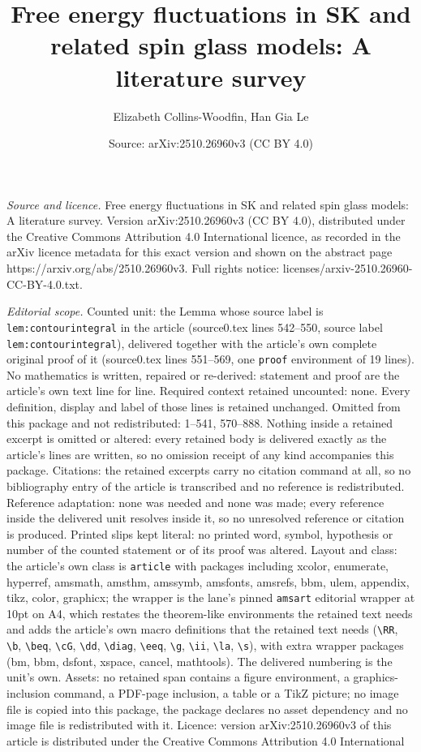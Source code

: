 \documentclass[10pt,a4paper]{amsart}
\title[Free energy fluctuations in SK and related spin glass models]{Free energy fluctuations in SK and related spin glass models: A literature survey}
\author{Elizabeth Collins-Woodfin, Han Gia Le}
\date{Source: arXiv:2510.26960v3 (CC BY 4.0)}
\begin{document}
\maketitle

\noindent\emph{Source and licence.} Free energy fluctuations in SK and related spin glass models: A literature survey. Version arXiv:2510.26960v3 (CC BY 4.0), distributed under the Creative Commons Attribution 4.0 International licence, as recorded in the arXiv licence metadata for this exact version and shown on the abstract page https://arxiv.org/abs/2510.26960v3. Full rights notice: licenses/arxiv-2510.26960-CC-BY-4.0.txt.\par\smallskip

\noindent\textit{Editorial scope.} Counted unit: the Lemma whose source label is \texttt{lem:contourintegral} in the article (source0.tex lines 542--550, source label \texttt{lem:contourintegral}), delivered together with the article's own complete original proof of it (source0.tex lines 551--569, one \texttt{proof} environment of 19 lines). No mathematics is written, repaired or re-derived: statement and proof are the article's own text line for line. Required context retained uncounted: none. Every definition, display and label of those lines is retained unchanged. Omitted from this package and not redistributed: 1--541, 570--888. Nothing inside a retained excerpt is omitted or altered: every retained body is delivered exactly as the article's lines are written, so no omission receipt of any kind accompanies this package. Citations: the retained excerpts carry no citation command at all, so no bibliography entry of the article is transcribed and no reference is redistributed. Reference adaptation: none was needed and none was made; every reference inside the delivered unit resolves inside it, so no unresolved reference or citation is produced. Printed slips kept literal: no printed word, symbol, hypothesis or number of the counted statement or of its proof was altered. Layout and class: the article's own class is \texttt{article} with packages including xcolor, enumerate, hyperref, amsmath, amsthm, amssymb, amsfonts, amsrefs, bbm, ulem, appendix, tikz, color, graphicx; the wrapper is the lane's pinned \texttt{amsart} editorial wrapper at 10pt on A4, which restates the theorem-like environments the retained text needs and adds the article's own macro definitions that the retained text needs (\texttt{\textbackslash RR}, \texttt{\textbackslash b}, \texttt{\textbackslash beq}, \texttt{\textbackslash cG}, \texttt{\textbackslash dd}, \texttt{\textbackslash diag}, \texttt{\textbackslash eeq}, \texttt{\textbackslash g}, \texttt{\textbackslash ii}, \texttt{\textbackslash la}, \texttt{\textbackslash s}), with extra wrapper packages (bm, bbm, dsfont, xspace, cancel, mathtools). The delivered numbering is the unit's own. Assets: no retained span contains a figure environment, a graphics-inclusion command, a PDF-page inclusion, a table or a TikZ picture; no image file is copied into this package, the package declares no asset dependency and no image file is redistributed with it. Licence: version arXiv:2510.26960v3 of this article is distributed under the Creative Commons Attribution 4.0 International 
\end{document}

